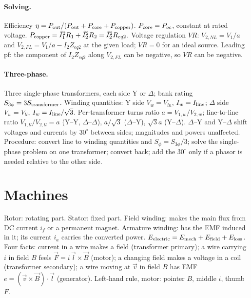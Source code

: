 \documentclass{article}
\begin{document}
\paragraph{Solving.}
Efficiency $\eta = P_{\rm out}/(P_{\rm out} + P_{\rm core} + P_{\rm copper})$.
$P_{\rm core} = P_{oc}$, constant at rated voltage.
$P_{\rm copper} = \tilde I_1^2 R_1 + \tilde I_2^2 R_2 = \tilde I_2^2 R_{eq2}$.
Voltage regulation $VR$: $V_{2,NL} = V_1/a$ and $V_{2,FL} = V_1/a - I_2 Z_{eq2}$ at the given load; $VR = 0$ for an ideal source.
Leading pf: the component of $I_2 Z_{eq2}$ along $V_{2,FL}$ can be negative, so $VR$ can be negative.

\paragraph{Three-phase.}
Three single-phase transformers, each side Y or $\Delta$; bank rating $S_{3\phi} = 3 S_{\rm transformer}$.
Winding quantities: Y side $V_w = V_{ln}$, $I_w = I_{\rm line}$; $\Delta$ side $V_w = V_{ll}$, $I_w = I_{\rm line}/\sqrt3$.
Per-transformer turns ratio $a = V_{1,w}/V_{2,w}$; line-to-line ratio $V_{1,ll}/V_{2,ll} = a$ (Y--Y, $\Delta$--$\Delta$), $a/\sqrt3$ ($\Delta$--Y), $\sqrt3 a$ (Y--$\Delta$).
$\Delta$--Y and Y--$\Delta$ shift voltages and currents by $30^\circ$ between sides; magnitudes and powers unaffected.
Procedure: convert line to winding quantities and $S_\phi = S_{3\phi}/3$; solve the single-phase problem on one transformer; convert back; add the $30^\circ$ only if a phasor is needed relative to the other side.




\section{Machines}
Rotor: rotating part. Stator: fixed part.
Field winding: makes the main flux from DC current $i_f$ or a permanent magnet.
Armature winding: has the EMF induced in it; its current $i_a$ carries the converted power.
$E_{\rm electric} = E_{\rm mech} + E_{\rm field} + E_{\rm loss}$.
Four facts: current in a wire makes a field (transformer primary); a wire carrying $i$ in field $B$ feels $\vec F = i\,\vec l\times\vec B$ (motor); a changing field makes a voltage in a coil (transformer secondary); a wire moving at $\vec v$ in field $B$ has EMF $e = (\vec v\times\vec B)\cdot\vec l$ (generator).
Left-hand rule, motor: pointer $B$, middle $i$, thumb $F$.
\end{document}
